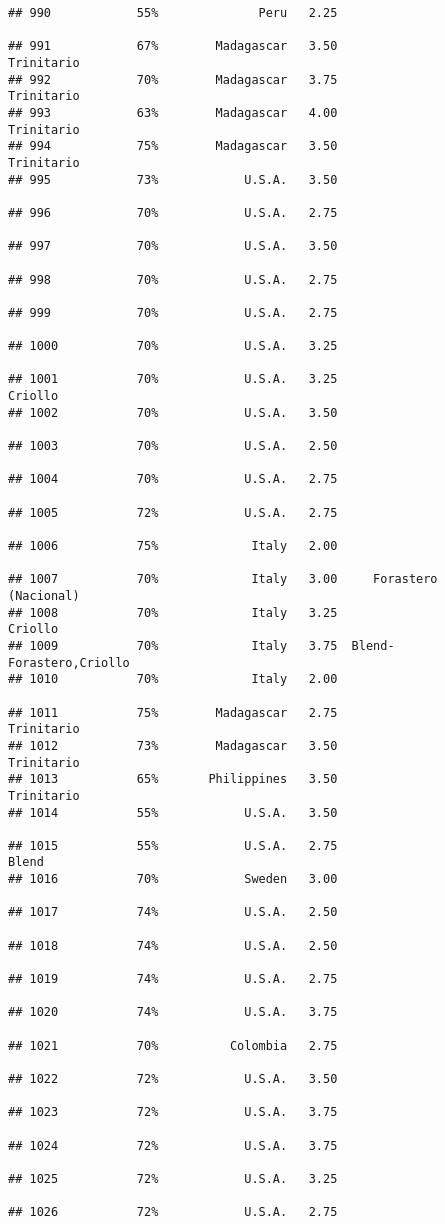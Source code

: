 \documentclass[
]{article}
\begin{document}
\begin{verbatim}
## 990            55%              Peru   2.25                         
## 991            67%        Madagascar   3.50               Trinitario
## 992            70%        Madagascar   3.75               Trinitario
## 993            63%        Madagascar   4.00               Trinitario
## 994            75%        Madagascar   3.50               Trinitario
## 995            73%            U.S.A.   3.50                         
## 996            70%            U.S.A.   2.75                         
## 997            70%            U.S.A.   3.50                         
## 998            70%            U.S.A.   2.75                         
## 999            70%            U.S.A.   2.75                         
## 1000           70%            U.S.A.   3.25                         
## 1001           70%            U.S.A.   3.25                  Criollo
## 1002           70%            U.S.A.   3.50                         
## 1003           70%            U.S.A.   2.50                         
## 1004           70%            U.S.A.   2.75                         
## 1005           72%            U.S.A.   2.75                         
## 1006           75%             Italy   2.00                         
## 1007           70%             Italy   3.00     Forastero (Nacional)
## 1008           70%             Italy   3.25                  Criollo
## 1009           70%             Italy   3.75  Blend-Forastero,Criollo
## 1010           70%             Italy   2.00                         
## 1011           75%        Madagascar   2.75               Trinitario
## 1012           73%        Madagascar   3.50               Trinitario
## 1013           65%       Philippines   3.50               Trinitario
## 1014           55%            U.S.A.   3.50                         
## 1015           55%            U.S.A.   2.75                    Blend
## 1016           70%            Sweden   3.00                         
## 1017           74%            U.S.A.   2.50                         
## 1018           74%            U.S.A.   2.50                         
## 1019           74%            U.S.A.   2.75                         
## 1020           74%            U.S.A.   3.75                         
## 1021           70%          Colombia   2.75                         
## 1022           72%            U.S.A.   3.50                         
## 1023           72%            U.S.A.   3.75                         
## 1024           72%            U.S.A.   3.75                         
## 1025           72%            U.S.A.   3.25                         
## 1026           72%            U.S.A.   2.75                         

\end{verbatim}
\end{document}
